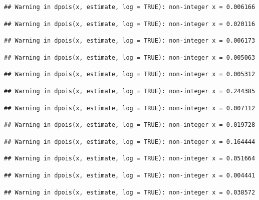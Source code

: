 \documentclass[]{article}
\begin{document}
\begin{verbatim}
## Warning in dpois(x, estimate, log = TRUE): non-integer x = 0.006166
\end{verbatim}

\begin{verbatim}
## Warning in dpois(x, estimate, log = TRUE): non-integer x = 0.020116
\end{verbatim}

\begin{verbatim}
## Warning in dpois(x, estimate, log = TRUE): non-integer x = 0.006173
\end{verbatim}

\begin{verbatim}
## Warning in dpois(x, estimate, log = TRUE): non-integer x = 0.005063
\end{verbatim}

\begin{verbatim}
## Warning in dpois(x, estimate, log = TRUE): non-integer x = 0.005312
\end{verbatim}

\begin{verbatim}
## Warning in dpois(x, estimate, log = TRUE): non-integer x = 0.244385
\end{verbatim}

\begin{verbatim}
## Warning in dpois(x, estimate, log = TRUE): non-integer x = 0.007112
\end{verbatim}

\begin{verbatim}
## Warning in dpois(x, estimate, log = TRUE): non-integer x = 0.019728
\end{verbatim}

\begin{verbatim}
## Warning in dpois(x, estimate, log = TRUE): non-integer x = 0.164444
\end{verbatim}

\begin{verbatim}
## Warning in dpois(x, estimate, log = TRUE): non-integer x = 0.051664
\end{verbatim}

\begin{verbatim}
## Warning in dpois(x, estimate, log = TRUE): non-integer x = 0.004441
\end{verbatim}

\begin{verbatim}
## Warning in dpois(x, estimate, log = TRUE): non-integer x = 0.038572
\end{verbatim}
\end{document}
